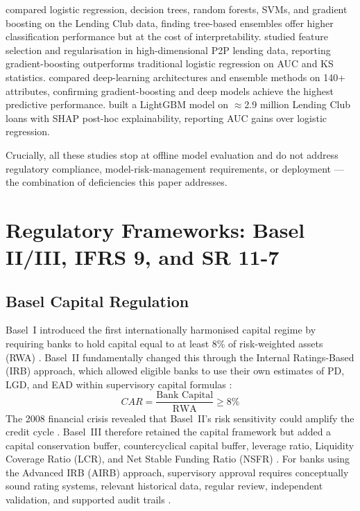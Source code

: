 \documentclass[12pt,a4paper]{report}
\begin{document}
\citet{gupta2022} compared logistic regression, decision trees, random forests, SVMs, and gradient boosting on the Lending Club data, finding tree-based ensembles offer higher classification performance but at the cost of interpretability. \citet{zhou2019} studied feature selection and regularisation in high-dimensional P2P lending data, reporting gradient-boosting outperforms traditional logistic regression on AUC and KS statistics. \citet{zhou2022_entropy} compared deep-learning architectures and ensemble methods on 140+ attributes, confirming gradient-boosting and deep models achieve the highest predictive performance. \citet{demajo2025} built a LightGBM model on $\approx$2.9 million Lending Club loans with SHAP post-hoc explainability, reporting AUC gains over logistic regression.

Crucially, all these studies stop at offline model evaluation and do not address regulatory compliance, model-risk-management requirements, or deployment --- the combination of deficiencies this paper addresses.

\section{Regulatory Frameworks: Basel II/III, IFRS 9, and SR 11-7}
\label{sec:regulation}

\subsection{Basel Capital Regulation}

Basel~I introduced the first internationally harmonised capital regime by requiring banks to hold capital equal to at least 8\% of risk-weighted assets (RWA) \cite{bcbs1988}. Basel~II fundamentally changed this through the Internal Ratings-Based (IRB) approach, which allowed eligible banks to use their own estimates of PD, LGD, and EAD within supervisory capital formulas \cite{bcbs2004, european_parliament2016}:
\begin{equation}
  CAR = \frac{\text{Bank Capital}}{\text{RWA}} \geq 8\%
\end{equation}
The 2008 financial crisis revealed that Basel~II's risk sensitivity could amplify the credit cycle \cite{repullo2010, ecb2009}. Basel~III therefore retained the capital framework but added a capital conservation buffer, countercyclical capital buffer, leverage ratio, Liquidity Coverage Ratio (LCR), and Net Stable Funding Ratio (NSFR) \cite{bcbs2010, bcbs2017}. For banks using the Advanced IRB (AIRB) approach, supervisory approval requires conceptually sound rating systems, relevant historical data, regular review, independent validation, and supported audit trails \cite{bcbs2022, eba2017a}.
\end{document}
